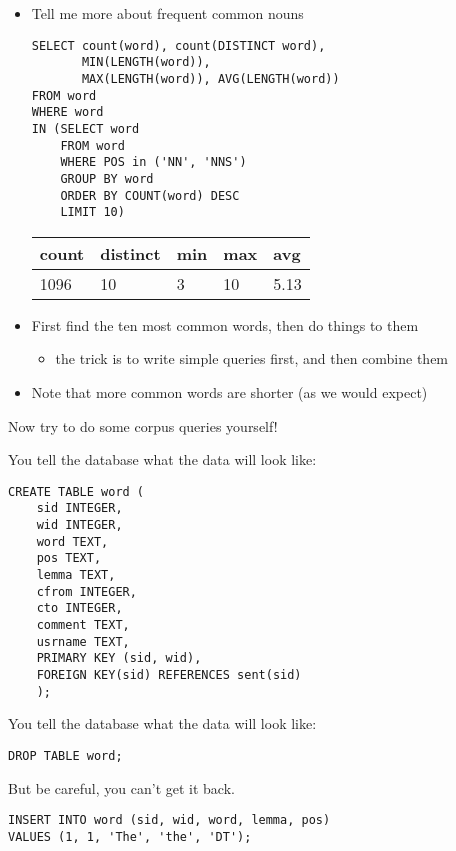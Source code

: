 \documentclass[a4paper,landscape,headrule,footrule,dvips]{foils}
\begin{document}
\begin{CJK}{UTF8}{min}

\begin{itemize}
\item Tell me more about frequent common nouns
\begin{verbatim}
SELECT count(word), count(DISTINCT word),
       MIN(LENGTH(word)), 
       MAX(LENGTH(word)), AVG(LENGTH(word))
FROM word
WHERE word 
IN (SELECT word
    FROM word
    WHERE POS in ('NN', 'NNS') 
    GROUP BY word
    ORDER BY COUNT(word) DESC
    LIMIT 10)

\end{verbatim}
  \begin{tabular}{lllll}
    \textbf{count}  & \textbf{distinct} &\textbf{min}  &  \textbf{max} & \textbf{avg} \\ \hline
    1096 & 10 & 3 & 10 & 5.13
  \end{tabular}
\item First find the ten most common words, then do things to them
  \begin{itemize}
  \item the trick is to write simple queries first, and then combine them
  \end{itemize}
\item Note that more common words are shorter (as we would expect)
\end{itemize}
\begin{center}
  Now try to do some corpus queries yourself!
\end{center}



You tell the database what the data will look like:
\begin{verbatim}
CREATE TABLE word (
    sid INTEGER,
    wid INTEGER,
    word TEXT,
    pos TEXT,
    lemma TEXT,
    cfrom INTEGER,
    cto INTEGER,
    comment TEXT,
    usrname TEXT,			
    PRIMARY KEY (sid, wid),
    FOREIGN KEY(sid) REFERENCES sent(sid)
    );
\end{verbatim}

You tell the database what the data will look like:
\begin{verbatim}
DROP TABLE word;
\end{verbatim}

But be careful, you can't get it back.


\begin{verbatim}
INSERT INTO word (sid, wid, word, lemma, pos)  
VALUES (1, 1, 'The', 'the', 'DT');
\end{verbatim}


\end{CJK}
\end{document}
